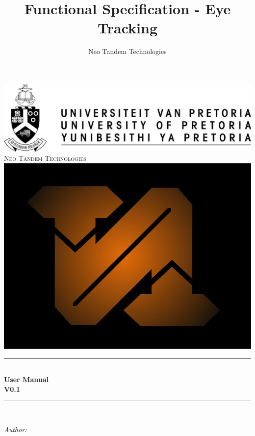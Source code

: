 \documentclass[a4paper,12pt]{report}
\author{Neo Tandem Technologies}
\title{ Functional Specification - Eye Tracking}
\newcommand{\HRule}{\rule{\linewidth}{0.5mm}}
\begin{document}
\setlength{\parskip}{6pt}

\begin{titlepage}

\begin{center}
\includegraphics[scale=1]{../GeneralImages/up-logo.jpg}
\\[1cm]    
    

\textsc{\LARGE Neo Tandem Technologies}\\[1.5cm]
\includegraphics[scale=0.2]{../GeneralImages/NTT.jpg}\\[1.5cm]
\HRule \\[0.4cm]
{ \huge \bfseries User Manual}\\[0.4cm]
{ \huge \bfseries V0.1}\\[0.4cm]
\HRule \\[0.4cm]
\begin{minipage}{0.4\textwidth}
\begin{flushleft} \large
\emph{Author:}\\

\end{flushleft}
\end{minipage}
\end{center}
\end{titlepage}
\end{document}
